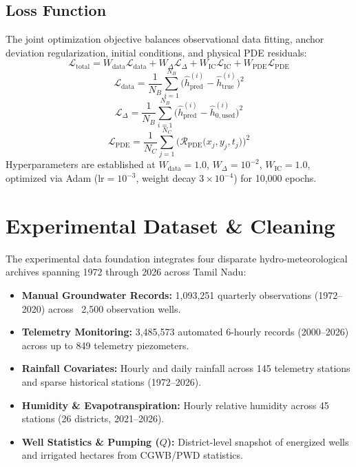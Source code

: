 \documentclass[10pt,conference,letterpaper]{IEEEtran}
\begin{document}
\subsection{Loss Function}
The joint optimization objective balances observational data fitting, anchor deviation regularization, initial conditions, and physical PDE residuals:
\begin{equation}
\mathcal{L}_{\text{total}} = W_{\text{data}} \mathcal{L}_{\text{data}} + W_{\Delta} \mathcal{L}_{\Delta} + W_{\text{IC}} \mathcal{L}_{\text{IC}} + W_{\text{PDE}} \mathcal{L}_{\text{PDE}}
\end{equation}
\begin{equation}
\mathcal{L}_{\text{data}} = \frac{1}{N_B} \sum_{i=1}^{N_B} \big( \hat{h}_{\text{pred}}^{(i)} - \hat{h}_{\text{true}}^{(i)} \big)^2
\end{equation}
\begin{equation}
\mathcal{L}_{\Delta} = \frac{1}{N_B} \sum_{i=1}^{N_B} \big( \hat{h}_{\text{pred}}^{(i)} - \hat{h}_{0,\text{used}}^{(i)} \big)^2
\end{equation}
\begin{equation}
\mathcal{L}_{\text{PDE}} = \frac{1}{N_C} \sum_{j=1}^{N_C} \Big( \mathcal{R}_{\text{PDE}}\big(x_j, y_j, t_j\big) \Big)^2
\end{equation}
Hyperparameters are established at $W_{\text{data}} = 1.0$, $W_{\Delta} = 10^{-2}$, $W_{\text{IC}} = 1.0$, optimized via Adam ($\text{lr} = 10^{-3}$, weight decay $3 \times 10^{-4}$) for 10,000 epochs.

\section{Experimental Dataset \& Cleaning}
The experimental data foundation integrates four disparate hydro-meteorological archives spanning 1972 through 2026 across Tamil Nadu:
\begin{itemize}
    \item \textbf{Manual Groundwater Records:} 1,093,251 quarterly observations (1972--2020) across ~2,500 observation wells.
    \item \textbf{Telemetry Monitoring:} 3,485,573 automated 6-hourly records (2000--2026) across up to 849 telemetry piezometers.
    \item \textbf{Rainfall Covariates:} Hourly and daily rainfall across 145 telemetry stations and sparse historical stations (1972--2026).
    \item \textbf{Humidity \& Evapotranspiration:} Hourly relative humidity across 45 stations (26 districts, 2021--2026).
    \item \textbf{Well Statistics \& Pumping ($Q$):} District-level snapshot of energized wells and irrigated hectares from CGWB/PWD statistics.
\end{itemize}
\end{document}
